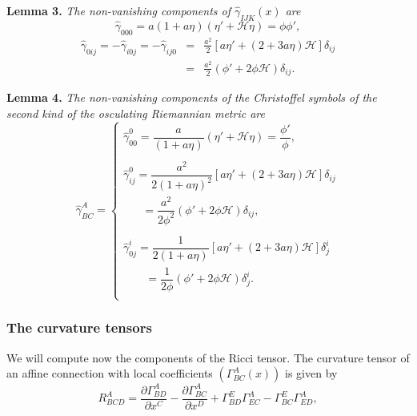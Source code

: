 \documentclass[aps,superscriptaddress, showpacs,preprintnumbers, superscriptaddress, nofootinbibt,twocolumn]{revtex4-2}
\begin{document}
{\bf Lemma 3.}
{\it The non-vanishing components of $\hat{\gamma}_{IJK}(x)$ are
\begin{equation*}
\hat\gamma_{000}=a(1+a\eta)(\eta '+\mathcal{H}\eta)=\phi \phi ',
\end{equation*}
\begin{eqnarray*}
\hat\gamma_{0ij}=-\hat\gamma_{i0j}=-\hat\gamma_{ij0}
&=&%
\frac{a^2}{2}\left[a\eta '+(2+3a\eta)\mathcal{H}\right]\delta_{ij}\\
& =&\frac{a^2}{2}\left( \phi '+2\phi \mathcal{H}\right)\delta_{ij}.
 \end{eqnarray*}
\smallskip
}
\smallskip

{\bf Lemma 4.}
{\it The non-vanishing components of the Christoffel symbols of the second kind of the osculating Riemannian metric %
are
\begin{equation}
    \hat{\gamma}^A_{BC}=
    \begin{cases}
    \hat{\gamma}^0_{00}=\dfrac{a}{(1+a\eta)} (\eta '+\mathcal{H}\eta)=\dfrac{\phi '}{\phi},  \\
    \ \\
    \hat{\gamma}^0_{ij}= \dfrac{a^2}{2(1+a\eta)^2}\left[a\eta '+
    (2+3a\eta)\mathcal{H}
    \right]\delta_{ij}  \\
   \;\;\;\;\;\; =\dfrac{a^2}{2\phi^2}\left(\phi '+2\phi \mathcal{H} \right)\delta_{ij},
    \\
    \ \\
    \hat{\gamma}^i_{0j}=\dfrac{1}{2(1+a\eta)}\left[a\eta '+
    (2+3a\eta)\mathcal{H}
    \right]\delta ^{i}_{j}  \\
   \;\;\;\;\;\;\; =\dfrac{1}{2\phi}\left(\phi'+2\phi \mathcal{H} \right)\delta^{i}_{j} %
    . \\
    \end{cases}
\end{equation}
}

\subsubsection{The curvature tensors}

We will compute now the components of the Ricci tensor. The curvature tensor of an affine connection with local coefficients $\left(\Gamma _{BC}^A(x)\right)$ is given by
\begin{equation}
R^A_{BCD}=\dfrac{\partial \Gamma^A_{BD}}{\partial x^C}-
    \dfrac{\partial \Gamma^A_{BC}}{\partial x^D}+\Gamma^E_{BD}\Gamma^A_{EC}
    -\Gamma^E_{BC}\Gamma^A_{ED},
    \end{equation}
\end{document}
